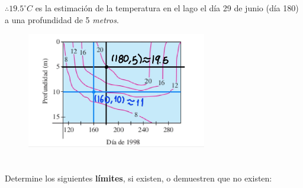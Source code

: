 \documentclass[12pt]{article}
\begin{document}
$\therefore {19.5}^\circ C$ es la estimación de la temperatura en el lago el día 29 de junio (día 180) a una profundidad de 5 \textit{metros}.
\begin{figure}[H]
  \centering
  \includegraphics[width=0.7\textwidth]{./img/t3_ej2r.jpeg}
\end{figure}
\section{}

Determine los siguientes \textbf{límites}, si existen, o demuestren que no existen:
\end{document}
